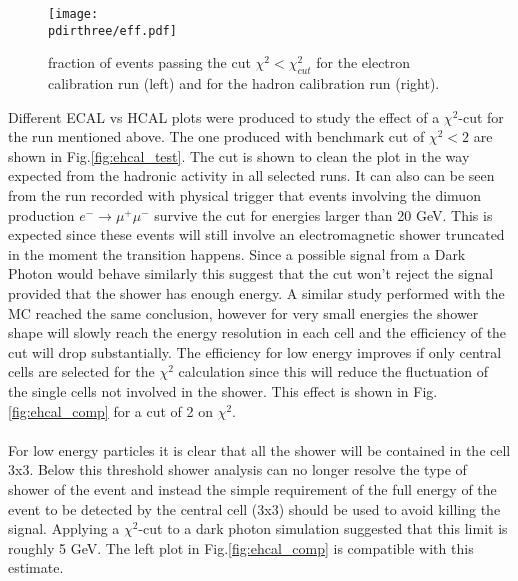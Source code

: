\begin{figure}[h!]
  \begin{center}
    \texttt{[image: \\pdirthree/eff.pdf]}
  \end{center}
  \caption[fraction of events passing the $\chi^2$ cut]{fraction of events passing the cut $\chi^2 < \chi^2_{cut}$
    for the electron calibration run (left) and for the hadron calibration run (right).}
  \label{fig:eff}
\end{figure}

\clearpage

Different ECAL vs HCAL plots were produced to study the effect of a
$\chi^2$-cut for the run mentioned above. The one produced with
benchmark cut of $\chi^2 < 2$ are shown in
Fig.\ref{fig:ehcal_test}. The cut is shown to clean the plot in the
way expected from the hadronic activity in all selected runs. It can also
can be seen from the run recorded with physical trigger that events involving the dimuon
production $e^- \to \mu^+\mu^-$ survive the cut for energies larger
than 20 GeV.  This is expected since these events will still involve
an electromagnetic shower truncated in the moment the transition
happens. Since a possible signal from a Dark Photon would behave
similarly this suggest that the cut won't reject the signal provided
that the shower has enough energy. A similar study performed with the
MC reached the same conclusion, however for
very small energies the shower shape will slowly reach the energy
resolution in each cell and the efficiency of the cut will drop
substantially.  The efficiency for low energy improves if only central
cells are selected for the $\chi^2$ calculation since this will reduce
the fluctuation of the single cells not involved in the shower. This
effect is shown in Fig.\ref{fig:ehcal_comp} for a cut of 2 on $\chi^2$.
\\
\\
For low energy particles it is clear that all the shower will be
contained in the cell 3x3. Below this threshold shower analysis can no
longer resolve the type of shower of the event and instead the simple
requirement of the full energy of the event to be detected by the
central cell (3x3) should be used to avoid killing the
signal. Applying a $\chi^2$-cut to a dark photon simulation suggested that this limit is roughly 5 GeV.  The
left plot in Fig.\ref{fig:ehcal_comp} is compatible with this
estimate.


